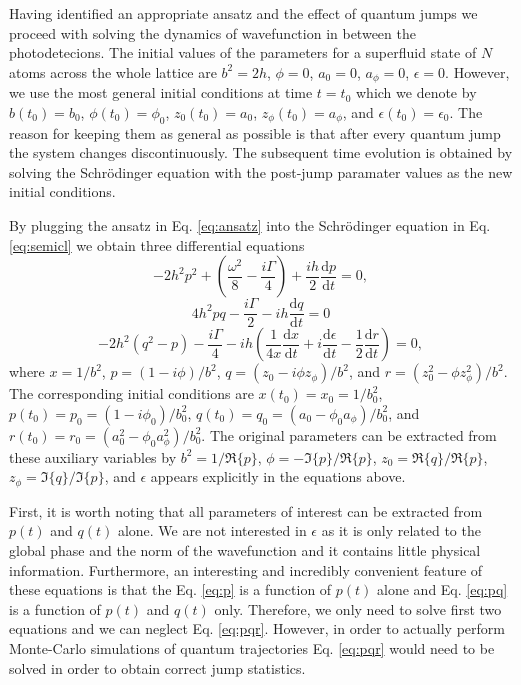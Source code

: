 Having identified an appropriate ansatz and the effect of quantum
jumps we proceed with solving the dynamics of wavefunction in between
the photodetecions. The initial values of the parameters for a
superfluid state of $N$ atoms across the whole lattice are $b^2 = 2h$,
$\phi =0$, $a_0 = 0$, $a_\phi = 0$, $\epsilon = 0$. However, we use
the most general initial conditions at time $t = t_0$ which we denote
by $b(t_0) = b_0$, $\phi(t_0) = \phi_0$, $z_0(t_0) = a_0$,
$z_\phi(t_0) = a_\phi$, and $\epsilon(t_0) = \epsilon_0$. The reason
for keeping them as general as possible is that after every quantum
jump the system changes discontinuously. The subsequent time evolution
is obtained by solving the Schr\"{o}dinger equation with the post-jump
paramater values as the new initial conditions.

By plugging the ansatz in Eq. \eqref{eq:ansatz} into the
Schr\"{o}dinger equation in Eq. \eqref{eq:semicl} we obtain three
differential equations
\begin{equation}
  \label{eq:p}
  -2 h^2 p^2 + \left( \frac{ \omega^2 } { 8 } - \frac{ i \Gamma } { 4
    } \right) + \frac{ i h } { 2 } \frac{ \mathrm{d} p } { \mathrm{d}
    t } = 0,
\end{equation}
\begin{equation}
  \label{eq:pq}
  4 h^2 p q - \frac{ i \Gamma } { 2 } - i h \frac{ \mathrm{d} q } {
    \mathrm{d} t } = 0
\end{equation}
\begin{equation}
  \label{eq:pqr}
  -2 h^2 (q^2 - p) - \frac{ i \Gamma } { 4 } - i h \left( \frac{ 1 } {
      4 x } \frac{ \mathrm{d} x } {\mathrm{d} t } + i \frac{
      \mathrm{d} \epsilon } { \mathrm{d} t } - \frac{1}{2} \frac{
      \mathrm{d} r } { \mathrm{d} t } \right) = 0,
\end{equation}
where $x = 1/b^2$, $p = (1 - i \phi)/b^2$,
$q = (z_0 - i \phi z_\phi)/b^2$, and
$r = (z_0^2 - \phi z_\phi^2)/b^2$. The corresponding initial
conditions are $x(t_0) = x_0 = 1/b_0^2$,
$p(t_0) = p_0 = (1 - i \phi_0)/b_0^2$,
$q(t_0) = q_0 = (a_0 - \phi_0 a_\phi)/b_0^2$, and
$r(t_0) = r_0 = (a_0^2 - \phi_0 a_\phi^2)/b_0^2$. The original
parameters can be extracted from these auxiliary variables by
$b^2 = 1 / \Re \{ p \}$, $\phi = - \Im \{ p \} / \Re \{ p \}$,
$z_0 = \Re \{ q \} / \Re \{ p \}$,
$z_\phi = \Im \{ q \} / \Im \{ p \}$, and $\epsilon$ appears
explicitly in the equations above.

First, it is worth noting that all parameters of interest can be
extracted from $p(t)$ and $q(t)$ alone. We are not interested in
$\epsilon$ as it is only related to the global phase and the norm of
the wavefunction and it contains little physical
information. Furthermore, an interesting and incredibly convenient
feature of these equations is that the Eq. \eqref{eq:p} is a function
of $p(t)$ alone and Eq. \eqref{eq:pq} is a function of $p(t)$ and
$q(t)$ only. Therefore, we only need to solve first two equations and
we can neglect Eq. \eqref{eq:pqr}. However, in order to actually
perform Monte-Carlo simulations of quantum trajectories
Eq. \eqref{eq:pqr} would need to be solved in order to obtain correct
jump statistics.

